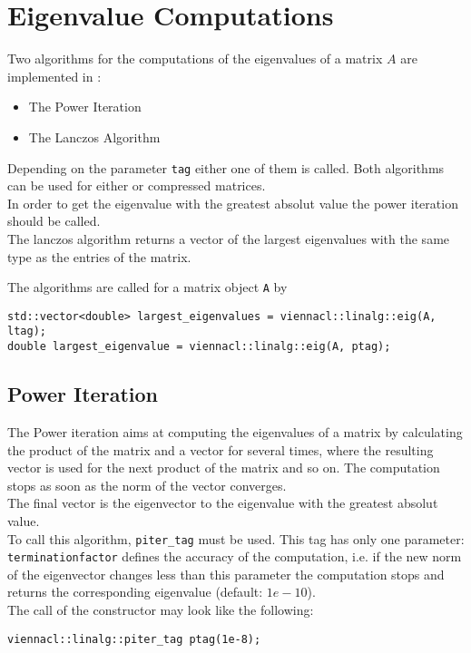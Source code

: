 \section{Eigenvalue Computations}
Two algorithms for the computations of the eigenvalues of a matrix $A$ are implemented in {\ViennaCL}:
\begin{itemize}
\item The Power Iteration \cite{golub:matrix-computations}
\item The Lanczos Algorithm \cite{simon:lanczos-pro}
\end{itemize}
Depending on the parameter \lstinline|tag| either one of them is called. 
Both algorithms can be used for either {\ublas} or {\ViennaCL} compressed matrices.\\
In order to get the eigenvalue with the greatest absolut value the power iteration should be called. \\
The lanczos algorithm returns a vector of the largest eigenvalues with the same type as the entries of the matrix.

The algorithms are called for a matrix object \lstinline|A| by
\begin{lstlisting}
std::vector<double> largest_eigenvalues = viennacl::linalg::eig(A, ltag);
double largest_eigenvalue = viennacl::linalg::eig(A, ptag);
\end{lstlisting}


\subsection{Power Iteration}
The Power iteration aims at computing the eigenvalues of a matrix by calculating the product of the matrix and a vector for several times, where the resulting vector is used for the next product of the matrix and so on. The computation stops as soon as the norm of the vector converges. \\
The final vector is the eigenvector to the eigenvalue with the greatest absolut value.\\
To call this algorithm, \lstinline|piter_tag| must be used.
This tag has only one parameter: \\ \lstinline|terminationfactor| defines the accuracy of the computation, i.e. if the new norm of the eigenvector changes less than this parameter the computation stops and returns the corresponding eigenvalue (default: $1e-10$).\\
The call of the constructor may look like the following:
\begin{lstlisting} 
viennacl::linalg::piter_tag ptag(1e-8);
\end{lstlisting}

